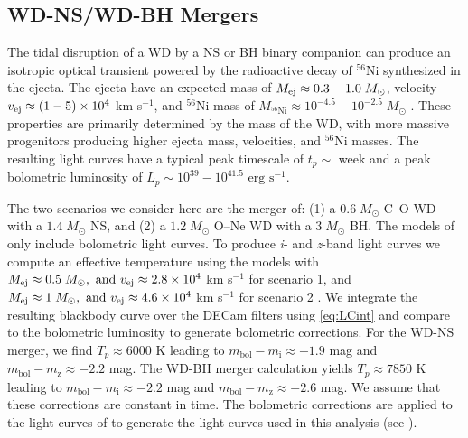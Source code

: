 \subsection{WD-NS/WD-BH Mergers}
\label{sec:ch2_WDmerge}
The tidal disruption of a WD by a NS or BH binary companion can produce an isotropic optical transient powered by the radioactive decay of ${}^{56}$Ni synthesized in the ejecta. The ejecta have an expected mass of $M_{\rm ej} \approx 0.3-1.0 \; M_{\odot}$, velocity $v_{\rm ej} \approx (1-5) \times 10^4$ km s$^{-1}$, and $^{56}$Ni mass of $M_{\text{$^{56}$Ni}} \approx 10^{-4.5} - 10^{-2.5}\;M_{\odot}$ \citep{Metzger2012}. These properties are primarily determined by the mass of the WD, with more massive progenitors producing higher ejecta mass, velocities, and $^{56}$Ni masses. The resulting light curves have a typical peak timescale of $t_p \sim $ week and a peak bolometric luminosity of $L_p \sim 10^{39} - 10^{41.5} \text{ erg s}^{-1}$.

The two scenarios we consider here are the merger of: (1) a $0.6\;M_{\odot}$ C--O WD with a $1.4\;M_{\odot}$ NS, and (2) a $1.2\;M_{\odot}$ O--Ne WD with a $3\;M_{\odot}$ BH. The models of \citet{Metzger2012} only include bolometric light curves. To produce {\em i}- and {\em z}-band light curves we compute an effective temperature using the  models with $M_{\rm ej} \approx 0.5\;M_{\odot},\text{ and }v_{\rm ej} \approx 2.8\times10^4$ km s$^{-1}$ for scenario 1, and $M_{\rm ej} \approx 1\;M_{\odot},\text{ and } v_{\rm ej} \approx 4.6\times10^4$ km s$^{-1}$ for scenario 2 \citep[see Figure 7 of][]{Metzger2012}. We integrate the resulting blackbody curve over the DECam filters using \cref{eq:LCint} and compare to the bolometric luminosity to generate bolometric corrections. For the WD-NS merger, we find $T_p \approx 6000$ K leading to $m_{\text{bol}} - m_{\text{i}} \approx -1.9$ mag and $m_{\text{bol}} - m_{\text{z}} \approx -2.2$ mag. The WD-BH merger calculation yields $T_p \approx 7850$ K leading to $m_{\text{bol}} - m_{\text{i}} \approx -2.2$ mag and $m_{\text{bol}} - m_{\text{z}} \approx -2.6$ mag. We assume that these corrections are constant in time. The bolometric corrections are applied to the light curves of \citet{Metzger2012} to generate the light curves used in this analysis (see ).

